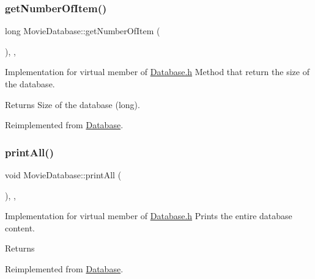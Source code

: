 \subsubsection{\texorpdfstring{get\+Number\+Of\+Item()}{getNumberOfItem()}}
{\footnotesize\ttfamily long Movie\+Database\+::get\+Number\+Of\+Item (\begin{DoxyParamCaption}{ }\end{DoxyParamCaption})\hspace{0.3cm}{\ttfamily [inline]}, {\ttfamily [override]}, {\ttfamily [virtual]}}



Implementation for virtual member of \hyperlink{Database_8h_source}{Database.\+h} Method that return the size of the database. 

\begin{DoxyReturn}{Returns}
Size of the database (long).
\end{DoxyReturn}


Reimplemented from \hyperlink{classDatabase_a230225cb341eb23a99a83ef3d1abae53}{Database}.

\mbox{\label{classMovieDatabase_af1e13b6fc0fd7186e98edbe2cf187618}} 
\subsubsection{\texorpdfstring{print\+All()}{printAll()}}
{\footnotesize\ttfamily void Movie\+Database\+::print\+All (\begin{DoxyParamCaption}{ }\end{DoxyParamCaption})\hspace{0.3cm}{\ttfamily [inline]}, {\ttfamily [override]}, {\ttfamily [virtual]}}



Implementation for virtual member of \hyperlink{Database_8h_source}{Database.\+h} Prints the entire database content. 

\begin{DoxyReturn}{Returns}

\end{DoxyReturn}


Reimplemented from \hyperlink{classDatabase_afa345da530fd5c8dfe0c978917cd6049}{Database}.

\mbox{\label{classMovieDatabase_a85faa4c33b3ab2dc0d1f4939bb034797}} 
